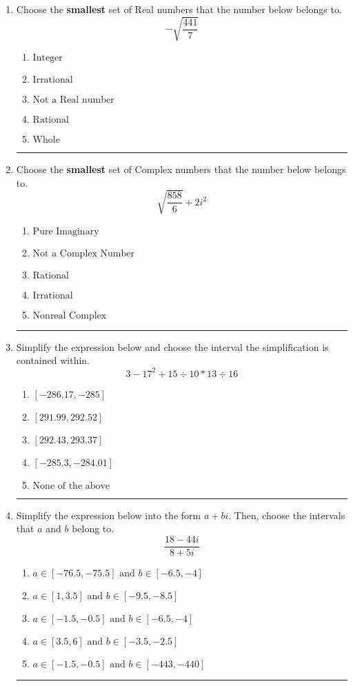 \documentclass[14pt]{extbook}
\newcommand{\litem}[1]{\item#1\hspace*{-1cm}\rule{\textwidth}{0.4pt}}
\begin{document}
\begin{enumerate}
{\begin{enumerate}[label=\Alph*.]
\end{enumerate} }
\litem{
Choose the \textbf{smallest} set of Real numbers that the number below belongs to.\[ -\sqrt{\frac{441}{7}} \]\begin{enumerate}[label=\Alph*.]
\item \( \text{Integer} \)
\item \( \text{Irrational} \)
\item \( \text{Not a Real number} \)
\item \( \text{Rational} \)
\item \( \text{Whole} \)

\end{enumerate} }
\litem{
Choose the \textbf{smallest} set of Complex numbers that the number below belongs to.\[ \sqrt{\frac{858}{6}}+2i^2 \]\begin{enumerate}[label=\Alph*.]
\item \( \text{Pure Imaginary} \)
\item \( \text{Not a Complex Number} \)
\item \( \text{Rational} \)
\item \( \text{Irrational} \)
\item \( \text{Nonreal Complex} \)

\end{enumerate} }
\litem{
Simplify the expression below and choose the interval the simplification is contained within.\[ 3 - 17^2 + 15 \div 10 * 13 \div 16 \]\begin{enumerate}[label=\Alph*.]
\item \( [-286.17, -285] \)
\item \( [291.99, 292.52] \)
\item \( [292.43, 293.37] \)
\item \( [-285.3, -284.01] \)
\item \( \text{None of the above} \)

\end{enumerate} }
\litem{
Simplify the expression below into the form $a+bi$. Then, choose the intervals that $a$ and $b$ belong to.\[ \frac{18 - 44 i}{8 + 5 i} \]\begin{enumerate}[label=\Alph*.]
\item \( a \in [-76.5, -75.5] \text{ and } b \in [-6.5, -4] \)
\item \( a \in [1, 3.5] \text{ and } b \in [-9.5, -8.5] \)
\item \( a \in [-1.5, -0.5] \text{ and } b \in [-6.5, -4] \)
\item \( a \in [3.5, 6] \text{ and } b \in [-3.5, -2.5] \)
\item \( a \in [-1.5, -0.5] \text{ and } b \in [-443, -440] \)


\end{enumerate}}
\end{enumerate}
\end{document}
